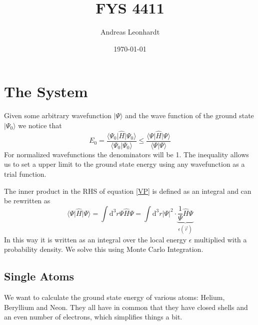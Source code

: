 \documentclass[a4paper,10pt]{article}
\title{FYS 4411 }
\author{Andreas Leonhardt}
\date{\today}
\newcommand{\ud}{\mathrm{d}}
\newcommand{\bra}[1]{\big\langle #1 \big|}
\newcommand{\ket}[1]{\big| #1 \big\rangle}
\newcommand{\braket}[2]{\big\langle #1 \big| #2 \big\rangle}
\begin{document}
\maketitle

\tableofcontents


\section{The System}

Given some arbitrary wavefunction $\ket{\Psi}$ and the wave function of the ground state $\ket{\Psi_0}$ we notice that
\begin{equation}
 E_0 = \frac{\bra{\Psi_0}\hat{H}\ket{\Psi_0}}{\braket{\Psi_0}{\Psi_0}} \le \frac{\bra{\Psi}\hat{H}\ket{\Psi}}{\braket{\Psi}{\Psi}} \label{VP}
\end{equation}
For normalized wavefunctions the denominators will be 1. 
The inequality allows us to set a upper limit to the ground state energy using any wavefunction as a trial function. 


The inner product in the RHS of equation \ref{VP} is defined as an integral and can be rewritten as
\begin{equation}
\bra{\Psi} \hat H \ket {\Psi} = \int \ud^3 r  \Psi \hat{H} \Psi = \int \ud^3 r |\Psi|^2\cdot \underbrace{\frac{1}{\Psi} \hat H \Psi }_{\epsilon(\vec{r})}
\end{equation}
In this way it is written as an integral over the local energy $\epsilon$ multiplied with a probability density. We solve this using Monte Carlo Integration. 

\subsection{ Single Atoms}

We want to calculate the ground state energy of various atoms: Helium, Beryllium and Neon. 
They all have in common that they have closed shells and an even number of electrons, which simplifies things a bit.
\end{document}
